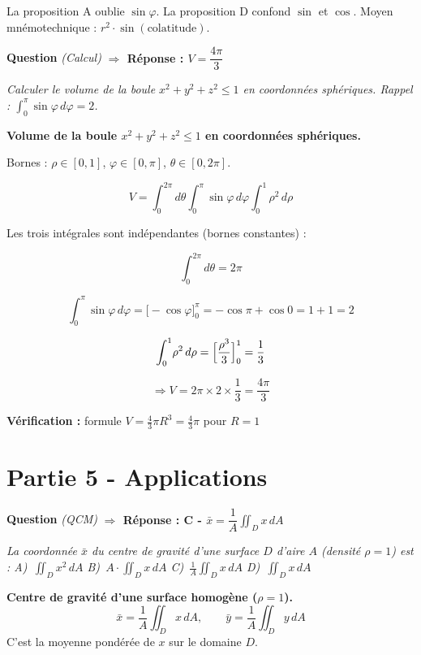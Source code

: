 \documentclass[11pt,a4paper]{article}
\newcounter{qnum}
\newcommand{\qtitre}[2]{%
  \stepcounter{qnum}%
  \medskip\noindent
  \textbf{\color{bleutexte}Question \theqnum}\enspace
  \textit{(#1)}\enspace
  \textcolor{vertok}{\textbf{$\Rightarrow$ Réponse : #2}}
  \par\smallskip
}
\newcommand{\qenonce}[1]{%
  \begin{mdframed}[backgroundcolor=grisbox, linewidth=0pt,
    innerleftmargin=8pt, innerrightmargin=8pt,
    innertopmargin=5pt, innerbottommargin=5pt,
    skipabove=2pt, skipbelow=4pt]
  \small\textit{#1}
  \end{mdframed}
}
\begin{document}
La proposition A oublie $\sin\varphi$. La proposition D confond $\sin$ et $\cos$. Moyen mnémotechnique : $r^2 \cdot \sin(\text{colatitude})$.

\qtitre{Calcul}{$V = \dfrac{4\pi}{3}$}
\qenonce{Calculer le volume de la boule $x^2+y^2+z^2\leq 1$ en coordonnées sphériques. \textit{Rappel :} $\int_0^\pi\sin\varphi\,d\varphi = 2$.}

\begin{reponsebox}
\textbf{Volume de la boule $x^2+y^2+z^2\leq 1$ en coordonnées sphériques.}

Bornes : $\rho \in [0,1]$, $\varphi \in [0,\pi]$, $\theta \in [0,2\pi]$.

$$V = \int_0^{2\pi}\!\!d\theta \int_0^\pi\!\sin\varphi\,d\varphi \int_0^1\!\rho^2\,d\rho$$

Les trois intégrales sont indépendantes (bornes constantes) :

$$\int_0^{2\pi}\!\!d\theta = 2\pi$$

$$\int_0^\pi\!\sin\varphi\,d\varphi = \bigl[-\cos\varphi\bigr]_0^\pi = -\cos\pi + \cos 0 = 1+1 = 2$$

$$\int_0^1\!\rho^2\,d\rho = \Bigl[\frac{\rho^3}{3}\Bigr]_0^1 = \frac{1}{3}$$

$$\Rightarrow V = 2\pi \times 2 \times \frac{1}{3} = \boxed{\frac{4\pi}{3}}$$

\textbf{Vérification :} formule $V = \tfrac{4}{3}\pi R^3 = \tfrac{4}{3}\pi$ pour $R=1$ \checkmark
\end{reponsebox}

\section{Partie 5 - Applications}

\qtitre{QCM}{C - $\bar{x} = \dfrac{1}{A}\iint_D x\,dA$}
\qenonce{La coordonnée $\bar{x}$ du centre de gravité d'une surface $D$ d'aire $A$ (densité $\rho=1$) est :
\quad A)~$\iint_D x^2\,dA$ \quad B)~$A\cdot\iint_D x\,dA$ \quad C)~$\tfrac{1}{A}\iint_D x\,dA$ \quad D)~$\iint_D x\,dA$}

\begin{methodebox}
\textbf{Centre de gravité d'une surface homogène ($\rho = 1$).}
$$\bar{x} = \frac{1}{A}\iint_D x\,dA,\qquad \bar{y} = \frac{1}{A}\iint_D y\,dA$$
C'est la moyenne pondérée de $x$ sur le domaine $D$.
\end{methodebox}
\end{document}
